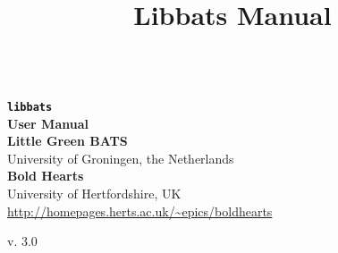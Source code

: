 \documentclass{scrbook}
\title{Libbats Manual}
\newcommand{\HRule}{\rule{\linewidth}{0.5mm}}
\begin{document}
\frontmatter

\begin{titlepage}
{\noindent
\vspace{2cm}\\
\textbf{
{\texttt{\Huge libbats}}\\[0.5cm]
{\textsf{\Huge User Manual}}\\[2.5cm]
}
 \textbf{\textsf{\Large Little Green BATS}}\\
 {\sf\large University of Groningen, the Netherlands}\\[0.5cm]
 \textbf{\textsf{\Large Bold Hearts}}\\
 {\sf\large University of Hertfordshire, UK}\\
 {\large\url{http://homepages.herts.ac.uk/~epics/boldhearts}}\\[0.5cm]
\vfill
\begin{center}
{\sf\large v. 3.0}
\end{center}
}
\end{titlepage}

\tableofcontents

%

\mainmatter



%
%
%

%
%






%

\backmatter
%
%
%
%
\end{document}
